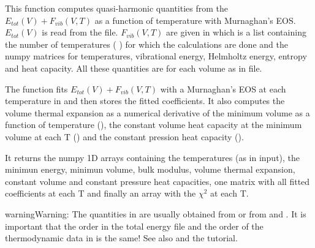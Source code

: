\documentclass[letterpaper,10pt,english]{sphinxmanual}
\begin{document}
\begin{fulllineitems}
\label{pyqha:pyqha.fitFvib.fitFvibV}
This function computes quasi-harmonic quantities from the 
\(E_{tot}(V)+F_{vib}(V,T)\) as a function of temperature with Murnaghan's
EOS. \(E_{tot}(V)\) is read from the  file. \(F_{vib}(V,T)\)
are given in  which is a list containing the number of temperatures
(  ) for which the calculations are done and the numpy matrices for 
temperatures, vibrational energy, Helmholtz energy, entropy and
heat capacity. All these quantities are for each volume as in  file.

The function fits \(E_{tot}(V)+F_{vib}(V,T)\) with a Murnaghan's EOS
at each temperature in  and then stores the fitted coefficients.
It also computes the volume thermal expansion as a numerical derivative of
the minimum volume as a function of temperature (), the
constant volume heat capacity at the minimum volume at each T
() and the constant pression heat capacity ().

It returns the numpy 1D arrays containing the temperatures (as in input), the
minimun energy, minimun volume, bulk modulus, volume thermal expansion, constant
volume and constant pressure heat capacities, one matrix with all fitted 
coefficients at each T and finally an array with the \(\chi^2\) at each T.

\begin{sphinxadmonition}{warning}{Warning:}
The quantities in  are usually obtained from 
or from  and . It is
important that the order in the total energy file  and the order of
the thermodynamic data in  is the same!  See also  and 
the tutorial.
\end{sphinxadmonition}

\end{fulllineitems}

\label{pyqha:module-pyqha.fitC}
\end{document}

